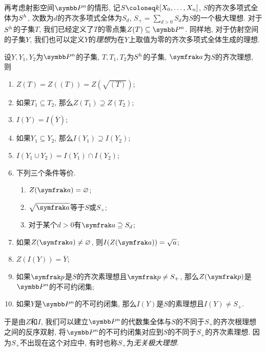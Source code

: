 再考虑射影空间$\PP^n$的情形, 记$S\coloneq \kk [X_0, \dotsc, X_n]$, $S$的齐次多项式全体为$S^h$, 次数为$d$的齐次多项式全体为$S_d$, $S_+=\sum_{d>0}S_d$为$S$的一个极大理想. 对于$S^h$的子集$T$, 我们已经定义了$T$的零点集$Z(T)\subseteq\PP^n$. 同样地, 对于仿射空间的子集$Y$, 我们也可以定义$Y$的\emph{理想}为在$Y$上取值为零的齐次多项式全体生成的理想.

\begin{proposition}\label{prop:projectivegaloisconnectionclosedradical}
  设$Y, Y_1, Y_2$为$\PP^n$的子集, $T, T_1, T_2$为$S^h$的子集, $\ideal{a}$为$S$的齐次理想, 则
  \begin{enumerate}
    \item\label{enum:prop-projective-galois-connection-closed-radical-1} $Z(T)=Z((T))=Z(\sqrt{(T)})$;
    \item\label{enum:prop-projective-galois-connection-closed-radical-2} 如果$T_1\subseteq T_2$, 那么$Z(T_1)\supseteq Z(T_2)$;
    \item\label{enum:prop-projective-galois-connection-closed-radical-3} $I(Y)=I(\overline{Y})$;
    \item\label{enum:prop-projective-galois-connection-closed-radical-4} 如果$Y_1\subseteq Y_2$, 那么$I(Y_1)\supseteq I(Y_2)$;
    \item\label{enum:prop-projective-galois-connection-closed-radical-5} $I(Y_1\cup Y_2)=I(Y_1)\cap I(Y_2)$;
    \item 下列三个条件等价.
    \begin{enumerate}
      \item $Z(\ideal{a})=\varnothing$;
      \item $\sqrt{\ideal{a}}$等于$S$或$S_+$;
      \item 对于某个$d>0$有$\ideal{a}\supseteq S_d$;
    \end{enumerate}
    \item\label{enum:prop-projective-galois-connection-closed-radical-nullstellensatz} 如果$Z(\ideal{a})\neq\varnothing$, 则$I(Z(\ideal{a}))=\sqrt{a}$;
    \item\label{enum:prop-projective-galois-connection-closed-radical-closure} $Z(I(Y))=\overline{Y}$;
    \item\label{enum:prop-projective-galois-connection-closed-radical-8} 如果$\ideal{p}$是$S$的齐次素理想且$\ideal{p}\neq S_+$, 那么$Z(\ideal{p})$是$\PP^n$的不可约闭集;
    \item\label{enum:prop-projective-galois-connection-closed-radical-9} 如果$Y$是$\PP^n$的不可约闭集, 那么$I(Y)$是$S$的素理想且$I(Y)\neq S_+$.
  \end{enumerate}
  于是由$Z$和$I$, 我们可以建立$\PP^n$的代数集全体与$S$的不同于$S_+$的齐次根理想之间的反序双射, 将$\PP^n$的不可约闭集对应到$S$的不同于$S_+$的齐次素理想. 因为$S_+$不出现在这个对应中, 有时也称$S_+$为\emph{无关极大理想}.
\end{proposition}

